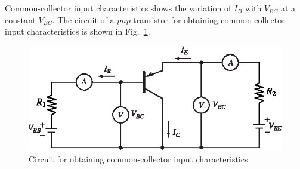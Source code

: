 Common-collector input characteristics shows the variation of $I_{B}$ with $V_{BC}$ at a constant $V_{EC}$. The circuit of a $pnp$ transistor for obtaining common-collector input characteristics is shown in Fig.~\ref{fig3.32}.
\begin{figure}[H]
\centering
\includegraphics[scale=1.05]{chap2/S3-EE-03-032.eps}
\caption{Circuit for obtaining common-collector input characteristics}\label{fig3.32}
\end{figure}
